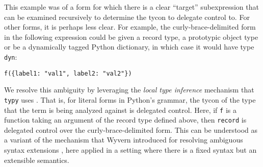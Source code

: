 \documentclass[9pt]{sigplanconf}
\newcommand{\FF}[1]{{\sf #1}}
\newcommand{\lstinlinep}[1]{\lstinline[language=Python,basicstyle=\ttfamily\small,deletendkeywords={tuple,buffer,map}]{#1}}
\begin{document}


This example was of a form for which there is a clear ``target'' subexpression that can be examined recursively to determine the tycon to delegate control to. For other forms, it is perhaps less clear. For example, the curly-brace-delimited form in the following expression could be given a record type, a prototypic object type or be a dynamically tagged Python dictionary, in which case it would have type \lstinline{dyn}:
\begin{lstlisting}[numbers=none]
f({label1: "val1", label2: "val2"})
\end{lstlisting}
We resolve this ambiguity by leveraging the \emph{local type inference} mechanism that \verb|typy| uses \cite{Pierce:2000:LTI:345099.345100}. That is, for literal forms in Python's grammar, the tycon of the type that the term is being analyzed against is delegated control. Here, if \lstinline{f} is a function taking an argument of the record type defined above, then \lstinline{record} is delegated control over the curly-brace-delimited form. This can be understood as a variant of the mechanism that Wyvern introduced for resolving ambiguous syntax extensions \cite{TSLs}, here applied in a setting where there is a fixed syntax but an extensible semantics.%
\end{document}
